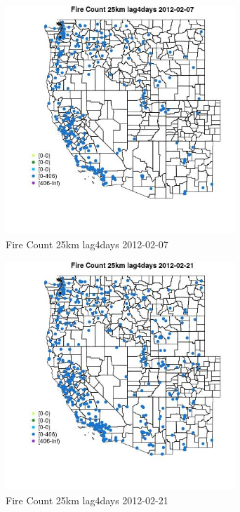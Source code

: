 \begin{figure} 
\centering  
\includegraphics[width=0.77\textwidth]{Code_Outputs/Report_ML_input_PM25_Step4_part_f_de_duplicated_aveswNAs_MapObsFire_Count_25km_lag4days2012-02-07.jpg} 
\caption{\label{fig:Report_ML_input_PM25_Step4_part_f_de_duplicated_aveswNAsMapObsFire_Count_25km_lag4days2012-02-07}Fire Count 25km lag4days 2012-02-07} 
\end{figure} 
 

\begin{figure} 
\centering  
\includegraphics[width=0.77\textwidth]{Code_Outputs/Report_ML_input_PM25_Step4_part_f_de_duplicated_aveswNAs_MapObsFire_Count_25km_lag4days2012-02-21.jpg} 
\caption{\label{fig:Report_ML_input_PM25_Step4_part_f_de_duplicated_aveswNAsMapObsFire_Count_25km_lag4days2012-02-21}Fire Count 25km lag4days 2012-02-21} 
\end{figure} 
 

